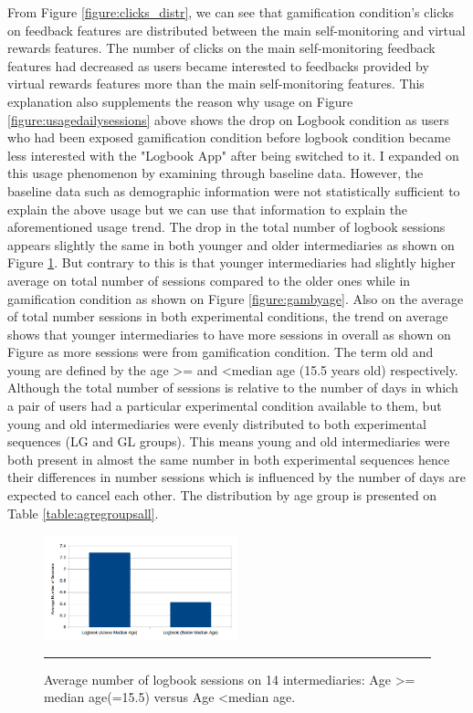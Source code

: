 From Figure \ref{figure:clicks_distr}, we can see that gamification condition's clicks on feedback features are distributed between the main self-monitoring and virtual rewards features. The number of clicks on the main self-monitoring feedback features had decreased as users became interested to feedbacks provided by virtual rewards features more than the main self-monitoring features. This explanation also supplements the reason why usage on Figure \ref{figure:usagedailysessions} above shows the drop on Logbook condition as users who had been exposed gamification condition before logbook condition became less interested with the "Logbook App" after being switched to it. I expanded on this usage phenomenon by examining through baseline data. However, the baseline data such as demographic information were not statistically sufficient to explain the above usage but we can use that information to explain the aforementioned usage trend. The drop in the total number of logbook sessions appears slightly the same in both younger and older intermediaries as shown on Figure \ref{figure:logbookbyage}.  But contrary to this is that younger intermediaries had slightly higher average on total number of sessions compared to the older ones while in gamification condition  as shown on Figure \ref{figure:gambyage}. Also on the average of total number sessions in both experimental conditions, the trend on average shows that younger intermediaries to have more sessions in overall as shown on Figure as more sessions were from gamification condition.  The term old and young are defined by the age \textgreater= and \textless median age (15.5 years old) respectively.  Although the total number of sessions is relative to the number of days in which a pair of users had a particular experimental condition available to them, but young and old intermediaries were evenly distributed to both experimental sequences (LG and GL groups). This means young and old intermediaries were both present in almost the same number in both experimental sequences hence their differences in number sessions which  is influenced by the number of days are expected to cancel each other. The distribution by age group is presented on Table \ref{table:agregroupsall}.\newline 
\begin{figure}[htbp]
  \centering
    \includegraphics[width=0.5\textwidth]{Figures/logbookbyage.png}
    \rule{35em}{0.5pt}
  \caption{Average number of logbook sessions on  14 intermediaries: Age \textgreater= median age(=15.5) versus Age \textless median age.}
  \label{figure:logbookbyage}
\end{figure}\newline
